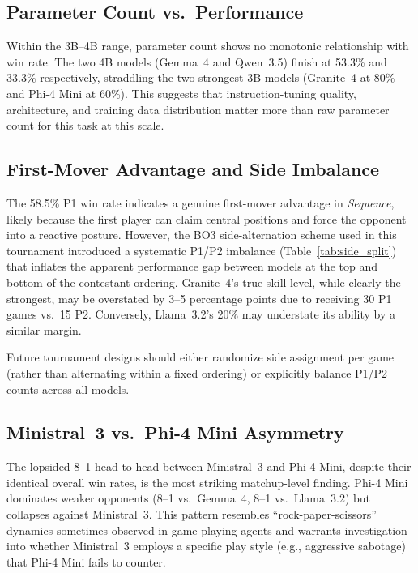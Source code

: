 \documentclass[11pt]{article}
\begin{document}
\subsection{Parameter Count vs.\ Performance}

Within the 3B--4B range, parameter count shows no monotonic relationship with win rate. The two 4B models (Gemma~4 and Qwen~3.5) finish at 53.3\% and 33.3\% respectively, straddling the two strongest 3B models (Granite~4 at 80\% and Phi-4 Mini at 60\%). This suggests that instruction-tuning quality, architecture, and training data distribution matter more than raw parameter count for this task at this scale.

\subsection{First-Mover Advantage and Side Imbalance}

The 58.5\% P1 win rate indicates a genuine first-mover advantage in \textit{Sequence}, likely because the first player can claim central positions and force the opponent into a reactive posture. However, the BO3 side-alternation scheme used in this tournament introduced a systematic P1/P2 imbalance (Table~\ref{tab:side_split}) that inflates the apparent performance gap between models at the top and bottom of the contestant ordering. Granite~4's true skill level, while clearly the strongest, may be overstated by 3--5 percentage points due to receiving 30 P1 games vs.\ 15 P2. Conversely, Llama~3.2's 20\% may understate its ability by a similar margin.

Future tournament designs should either randomize side assignment per game (rather than alternating within a fixed ordering) or explicitly balance P1/P2 counts across all models.

\subsection{Ministral~3 vs.\ Phi-4 Mini Asymmetry}

The lopsided 8--1 head-to-head between Ministral~3 and Phi-4 Mini, despite their identical overall win rates, is the most striking matchup-level finding. Phi-4 Mini dominates weaker opponents (8--1 vs.\ Gemma~4, 8--1 vs.\ Llama~3.2) but collapses against Ministral~3. This pattern resembles ``rock-paper-scissors'' dynamics sometimes observed in game-playing agents and warrants investigation into whether Ministral~3 employs a specific play style (e.g., aggressive sabotage) that Phi-4 Mini fails to counter.
\end{document}

